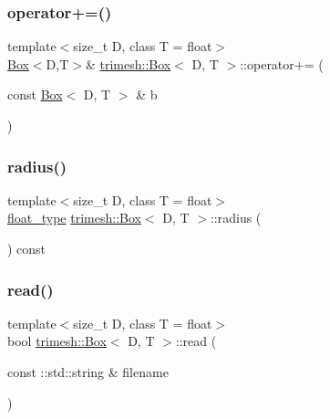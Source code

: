 \subsubsection{\texorpdfstring{operator+=()}{operator+=()}\hspace{0.1cm}{\footnotesize\ttfamily [2/2]}}
{\footnotesize\ttfamily template$<$size\+\_\+t D, class T = float$>$ \\
\hyperlink{classtrimesh_1_1Box}{Box}$<$D,T$>$\& \hyperlink{classtrimesh_1_1Box}{trimesh\+::\+Box}$<$ D, T $>$\+::operator+= (\begin{DoxyParamCaption}\item[{const \hyperlink{classtrimesh_1_1Box}{Box}$<$ D, T $>$ \&}]{b }\end{DoxyParamCaption})\hspace{0.3cm}{\ttfamily [inline]}}

\mbox{\label{classtrimesh_1_1Box_ae42a8b9c88800f8688495390b2452135}} 
\subsubsection{\texorpdfstring{radius()}{radius()}}
{\footnotesize\ttfamily template$<$size\+\_\+t D, class T = float$>$ \\
\hyperlink{classtrimesh_1_1Box_aa3a7238ce00e96ceaf24ecbb1077b7a4}{float\+\_\+type} \hyperlink{classtrimesh_1_1Box}{trimesh\+::\+Box}$<$ D, T $>$\+::radius (\begin{DoxyParamCaption}{ }\end{DoxyParamCaption}) const\hspace{0.3cm}{\ttfamily [inline]}}

\mbox{\label{classtrimesh_1_1Box_aa4e1ce7bc178d938a7f93d7a6d517796}} 
\subsubsection{\texorpdfstring{read()}{read()}}
{\footnotesize\ttfamily template$<$size\+\_\+t D, class T = float$>$ \\
bool \hyperlink{classtrimesh_1_1Box}{trimesh\+::\+Box}$<$ D, T $>$\+::read (\begin{DoxyParamCaption}\item[{const \+::std\+::string \&}]{filename }\end{DoxyParamCaption})\hspace{0.3cm}{\ttfamily [inline]}}

